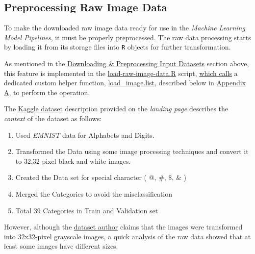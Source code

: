 \documentclass[
]{report}
\providecommand{\tightlist}{%
  \setlength{\itemsep}{0pt}\setlength{\parskip}{0pt}}
\begin{document}
\normalsize

\newpage

\subsection{Preprocessing Raw Image Data}\label{preprocessing-raw-image-data}

To make the downloaded raw image data ready for use in the \emph{Machine Learning Model Pipelines}, it must be properly preprocessed.
The raw data processing starts by loading it from its storage files into \texttt{R} objects for further transformation.

As mentioned in the \hyperref[downloading-preprocessing-input-datasets]{Downloading \& Preprocessing Input Datasets} section above, this feature is implemented in the \href{https://github.com/AzKurban-edX-DS/edx.capstone.choose-your-own/blob/main/r/support-scripts/load-raw-image-data.R}{load-raw-image-data.R} script, \href{https://github.com/AzKurban-edX-DS/edx.capstone.choose-your-own/blob/main/r/support-scripts/load-raw-image-data.R\#L16}{which calls} a dedicated custom helper function, \hyperref[func.load_image.list]{load\_image.list}, described below in \hyperref[appndx_a]{Appendix A}, to perform the operation.

The \href{https://www.kaggle.com/datasets/vaibhao/handwritten-characters}{Kaggle dataset} description provided on the \emph{landing page} describes the \emph{context} of the dataset as follows:

\begin{accentquote}

\begin{enumerate}
\def\labelenumi{\arabic{enumi}.}
\tightlist
\item
  Used \emph{EMNIST} data for Alphabets and Digits.
\item
  Transformed the Data using some image processing techniques and convert it to 32,32 pixel black and white images.
\item
  Created the Data set for special character ( @, \#, \$, \& )
\item
  Merged the Categories to avoid the misclassification
\item
  Total 39 Categories in Train and Validation set
\end{enumerate}

\end{accentquote}

However, although the \href{https://www.kaggle.com/vaibhao}{dataset author} claims that the images were transformed into 32x32-pixel grayscale images, a quick analysis of the raw data showed that at least some images have different sizes.
\end{document}

